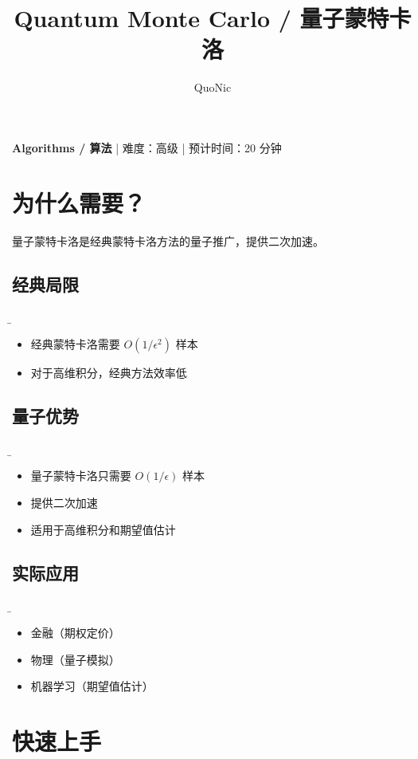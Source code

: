 \documentclass[12pt,a4paper]{article}
\title{Quantum Monte Carlo / 量子蒙特卡洛}
\author{QuoNic}
\date{}
\begin{document}
\maketitle

\begin{center}
\textbf{Algorithms / 算法} | 难度：高级 | 预计时间：20 分钟
\end{center}

\tableofcontents
\newpage

\section{为什么需要？}

量子蒙特卡洛是经典蒙特卡洛方法的量子推广，提供二次加速。

\subsection{经典局限}
\b\begin{itemize}
  \item 经典蒙特卡洛需要 $O(1/\epsilon^2)$ 样本
  \item 对于高维积分，经典方法效率低
\end{itemize}

\subsection{量子优势}
\b\begin{itemize}
  \item 量子蒙特卡洛只需要 $O(1/\epsilon)$ 样本
  \item 提供二次加速
  \item 适用于高维积分和期望值估计
\end{itemize}

\subsection{实际应用}
\b\begin{itemize}
  \item 金融（期权定价）
  \item 物理（量子模拟）
  \item 机器学习（期望值估计）
\end{itemize}

\section{快速上手}
\end{document}

